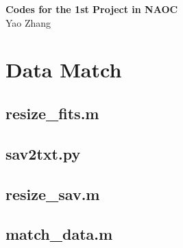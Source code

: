 \documentclass[11pt]{article}
\begin{document}
	\setcounter{section}{0} 
	\begin{center}
		{\LARGE \bf  Codes for the 1st Project  in NAOC}\\
		\vspace{0.5cm}
		{\large Yao Zhang}
	\end{center}
\vspace{-1.5cm}
	\begin{center}
		\begin{small}
			\tableofcontents
		\end{small}
	\end{center}
	
	\newpage
	
	\section{Data Match}
	
	\subsection{resize\_fits.m}
	\vspace{-0.25cm}
	 
	\vspace{0.25cm}
	
	\subsection{sav2txt.py}
	\vspace{-0.25cm}
	 
	\vspace{0.25cm}
	
	\subsection{resize\_sav.m}
	\vspace{-0.25cm}
	 
	\vspace{0.25cm}
	
	\subsection{match\_data.m}
	\vspace{-0.25cm}
	 
	\vspace{0.25cm}
	
\end{document}
